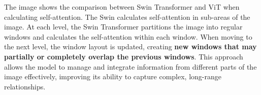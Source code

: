 The image shows the comparison between Swin Transformer and ViT when calculating self-attention. The Swin calculates self-attention in sub-areas of the image. At each level, the Swin Transformer partitions the image into regular windows and calculates the self-attention within each window. When moving to the next level, the window layout is updated, creating \textbf{new windows that may partially or completely overlap the previous windows}. This approach allows the model to manage and integrate information from different parts of the image effectively, improving its ability to capture complex, long-range relationships.